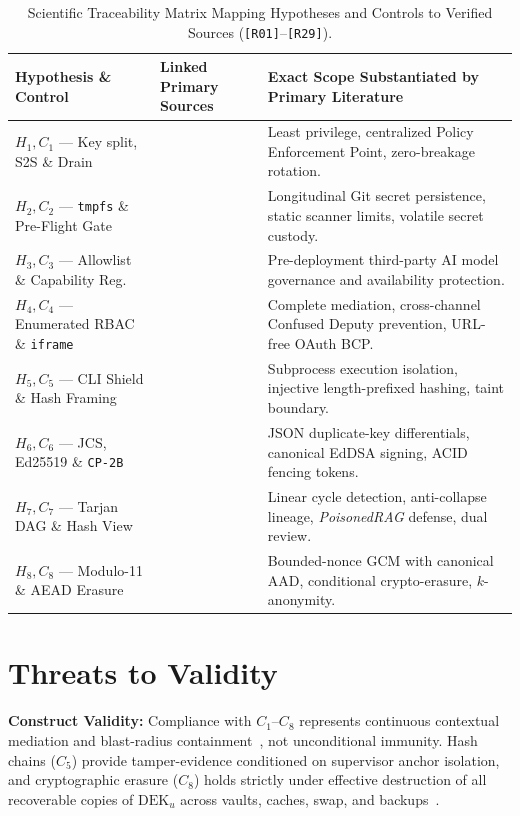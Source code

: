 \documentclass[10pt,twocolumn]{article}
\begin{document}
\begin{table}[t]
\centering
\caption{Scientific Traceability Matrix Mapping Hypotheses and Controls to Verified Sources (\texttt{[R01]}--\texttt{[R29]}).}
\label{tab:traceability}
\footnotesize
\begin{tabularx}{\textwidth}{@{}l l Y@{}}
\toprule
\textbf{Hypothesis \& Control} & \textbf{Linked Primary Sources} & \textbf{Exact Scope Substantiated by Primary Literature} \\
\midrule
$H_1, C_1$ --- Key split, S2S \& Drain & \cite{R01,R16,R20} & Least privilege, centralized Policy Enforcement Point, zero-breakage rotation. \\
$H_2, C_2$ --- \texttt{tmpfs} \& Pre-Flight Gate & \cite{R15,R18,R21} & Longitudinal Git secret persistence, static scanner limits, volatile secret custody. \\
$H_3, C_3$ --- Allowlist \& Capability Reg. & \cite{R24,R29} & Pre-deployment third-party AI model governance and availability protection. \\
$H_4, C_4$ --- Enumerated RBAC \& \texttt{iframe} & \cite{R01,R05,R28} & Complete mediation, cross-channel Confused Deputy prevention, URL-free OAuth BCP. \\
$H_5, C_5$ --- CLI Shield \& Hash Framing & \cite{R04,R22,R25,R27} & Subprocess execution isolation, injective length-prefixed hashing, taint boundary. \\
$H_6, C_6$ --- JCS, Ed25519 \& \texttt{CP-2B} & \cite{R03,R11,R12,R13,R17,R19} & JSON duplicate-key differentials, canonical EdDSA signing, ACID fencing tokens. \\
$H_7, C_7$ --- Tarjan DAG \& Hash View & \cite{R02,R08,R23,R26} & Linear cycle detection, anti-collapse lineage, \emph{PoisonedRAG} defense, dual review. \\
$H_8, C_8$ --- Modulo-11 \& AEAD Erasure & \cite{R06,R07,R09,R10,R14,R29} & Bounded-nonce GCM with canonical AAD, conditional crypto-erasure, $k$-anonymity. \\
\bottomrule
\end{tabularx}
\end{table}

\section{Threats to Validity}

\textbf{Construct Validity:} Compliance with $C_1$--$C_8$ represents continuous contextual mediation and blast-radius containment~\cite{R16}, not unconditional immunity. Hash chains ($C_5$) provide tamper-evidence conditioned on supervisor anchor isolation, and cryptographic erasure ($C_8$) holds strictly under effective destruction of all recoverable copies of $\mathrm{DEK}_u$ across vaults, caches, swap, and backups~\cite{R10}.
\end{document}
